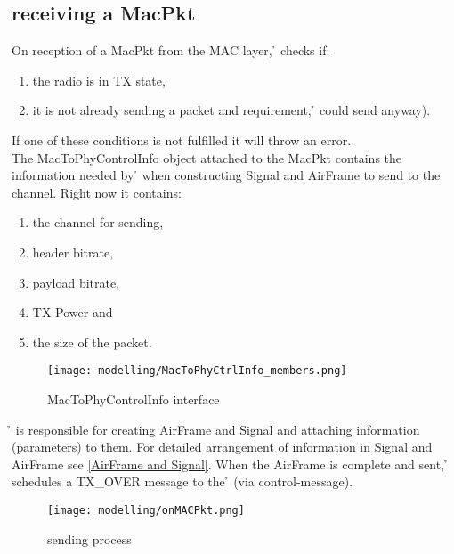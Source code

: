\subsection{receiving a MacPkt}

On reception of a MacPkt from the MAC layer, \h{\bp} checks if:
\begin{enumerate}
	\item the radio is in TX state,
	\item it is not already sending a packet and
requirement, \h{\bp} could send anyway).
\end{enumerate} 

If one of these conditions is not fulfilled it will throw an error.\\

The MacToPhyControlInfo object attached to the MacPkt contains the information
needed by \h{\bp} when constructing Signal and AirFrame to send to the channel.
Right now it contains:

\begin{enumerate}
	\item the channel for sending,
	\item header bitrate,
	\item payload bitrate,
	\item TX Power and
	\item the size of the packet.

\end{enumerate}


\begin{figure}[H]
 \centering
 \texttt{[image: modelling/MacToPhyCtrlInfo\_members.png]}
 \caption{MacToPhyControlInfo interface}
 \label{fig: MacToPhyCtrlInfo interface}
\end{figure}

\h{\bp} is responsible for creating AirFrame and Signal and attaching
information (parameters) to them. For detailed arrangement of information in
Signal and AirFrame see \ref{AirFrame and Signal}.
When the AirFrame is complete and sent, \h{\bp} schedules a TX\_OVER message to
the \h{\bm} (via control-message).

\begin{figure}[H]
 \centering
 \texttt{[image: modelling/onMACPkt.png]}
 \caption{sending process}
 \label{fig: sending process}
\end{figure}
\newpage



